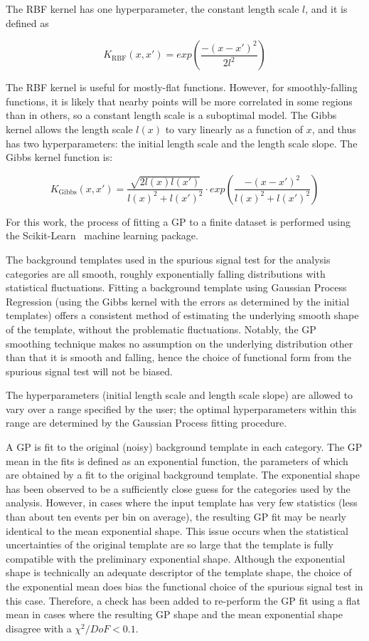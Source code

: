 The RBF kernel has one hyperparameter, the constant length scale $l$, and it is defined as

\begin{equation}
K_\text{RBF}(x,x') = exp\left(\frac{-(x-x')^2}{2l^2}\right)
\end{equation}

The RBF kernel is useful for mostly-flat functions. However, for smoothly-falling functions, it is likely that nearby points will be more correlated in some regions than in others, so a constant length scale is a suboptimal model. The Gibbs kernel allows the length scale $l(x)$ to vary linearly as a function of $x$, and thus has two hyperparameters: the initial length scale and the length scale slope. The Gibbs kernel function is: 

\begin{equation}
K_\text{Gibbs}(x, x') = \frac{\sqrt{2l(x)l(x')}}{l(x)^2 + l(x')^2 } \cdot exp\left( \frac{-(x-x')^2}{l(x)^2 + l(x')^2} \right)
\end{equation}

For this work, the process of fitting a GP to a finite dataset is performed using the Scikit-Learn~\cite{scikit-learn} machine learning package.

The background templates used in the spurious signal test for the analysis categories are all smooth,
roughly exponentially falling distributions with statistical fluctuations. Fitting a background template
using Gaussian Process Regression (using the Gibbs kernel with the errors as determined by the initial templates) offers a consistent method of estimating the underlying smooth shape of the template, without the problematic fluctuations. Notably, the GP smoothing technique makes no assumption on the underlying distribution other than that it is smooth and falling, hence the choice of functional form from the spurious signal test will not be biased.

The hyperparameters (initial length scale and length scale slope) are allowed to vary over a range specified by the user; the optimal hyperparameters within this range are determined by the Gaussian Process fitting procedure.

A GP is fit to the original (noisy) background template in each category. The GP mean in the fits is defined as an exponential function,
the parameters of which are obtained by a fit to the original background template. The exponential
shape has been observed to be a sufficiently close guess for the categories used by the analysis.
However, in cases where the input template has very few statistics (less than about ten events per
bin on average), the resulting GP fit may be nearly identical to the mean exponential shape. This
issue occurs when the statistical uncertainties of the original template are so large that the template
is fully compatible with the preliminary exponential shape. Although the exponential shape
is technically an adequate descriptor of the template shape, the choice of the exponential mean
does bias the functional choice of the spurious signal test in this case. Therefore, a check has been
added to re-perform the GP fit using a flat mean in cases where the resulting GP shape and the
mean exponential shape disagree with a $\chi^2/DoF < 0.1$.

